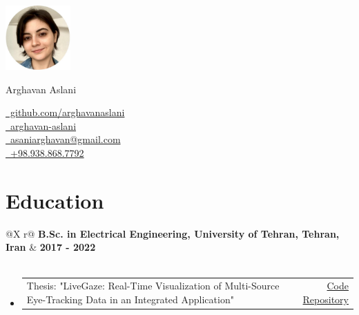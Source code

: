 \documentclass[a4paper,12pt]{article}
\begin{document}
\pagestyle{empty} 


\begin{minipage}[c]{2.5cm}
    \includegraphics[width=2.5cm]{./avatar/avatar6.jpg}
\end{minipage}%
\hspace{1em}
\begin{minipage}[c]{\dimexpr\linewidth-2.5cm-15em\relax}
    \Huge{Arghavan Aslani}
\end{minipage}%
\begin{minipage}[c]{0.3\linewidth}
    \href{https://github.com/arghavanaslani}{\raisebox{-0.05\height}\faGithub\ github.com/arghavanaslani} \\ 
    \href{https://www.linkedin.com/in/arghavan-aslani/}{\raisebox{-0.05\height}\faLinkedin\ arghavan-aslani} \\ 
    \href{mailto:aslaniarghavan@gmail.com}{\raisebox{-0.05\height}\faEnvelope \ asaniarghavan@gmail.com} \\ 
    \href{tel:+989388687792}{\raisebox{-0.05\height}\faMobile \ +98.938.868.7792}
\end{minipage}

\section{Education}
\begin{tabularx}{\linewidth}{@{}X r@{}}
    \textbf{B.Sc. in Electrical Engineering, University of Tehran, Tehran, Iran} & \textbf{2017 - 2022} \\
     \\
\end{tabularx}

\begin{itemize}
    \item 
    \begin{tabularx}{\linewidth}{@{}X r@{}}
        Thesis: "LiveGaze: Real-Time Visualization of Multi-Source Eye-Tracking Data in an Integrated Application" & \href{https://github.com/arghavanaslani/livegaze}{Code Repository} \\
    \end{tabularx}
\end{itemize}
\end{document}
